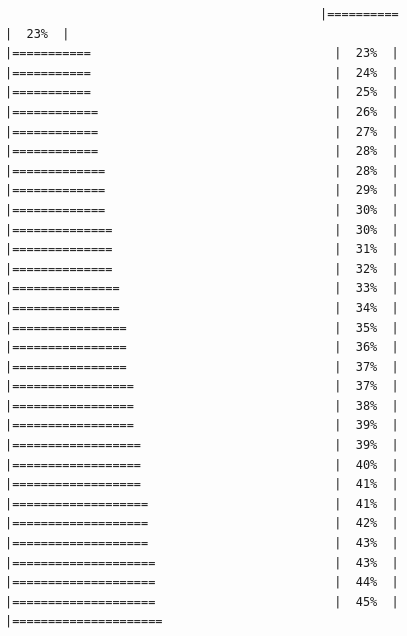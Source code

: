 \documentclass[
  krantz2]{krantz}
\begin{document}
\begin{verbatim}
                                            |==========                                   |  23%  |                                                     |===========                                  |  23%  |                                                     |===========                                  |  24%  |                                                     |===========                                  |  25%  |                                                     |============                                 |  26%  |                                                     |============                                 |  27%  |                                                     |============                                 |  28%  |                                                     |=============                                |  28%  |                                                     |=============                                |  29%  |                                                     |=============                                |  30%  |                                                     |==============                               |  30%  |                                                     |==============                               |  31%  |                                                     |==============                               |  32%  |                                                     |===============                              |  33%  |                                                     |===============                              |  34%  |                                                     |================                             |  35%  |                                                     |================                             |  36%  |                                                     |================                             |  37%  |                                                     |=================                            |  37%  |                                                     |=================                            |  38%  |                                                     |=================                            |  39%  |                                                     |==================                           |  39%  |                                                     |==================                           |  40%  |                                                     |==================                           |  41%  |                                                     |===================                          |  41%  |                                                     |===================                          |  42%  |                                                     |===================                          |  43%  |                                                     |====================                         |  43%  |                                                     |====================                         |  44%  |                                                     |====================                         |  45%  |                                                     |=====================             
\end{verbatim}
\end{document}
